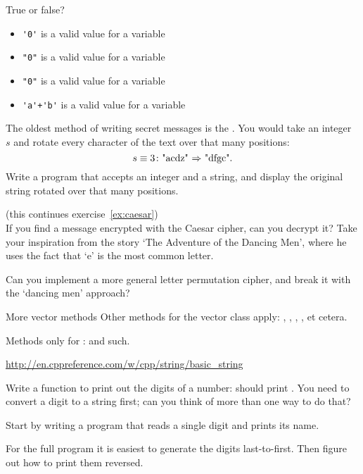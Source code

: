 \begin{review}
  \label{q:string}
  True or false?
  \begin{itemize}
  \item \verb+'0'+ is a valid value for a  variable
  \item \verb+"0"+ is a valid value for a  variable
  \item \verb+"0"+ is a valid value for a  variable
  \item \verb/'a'+'b'/ is a valid value for a  variable
  \end{itemize}
\end{review}

\begin{exercise}
  \label{ex:caesar}
  The oldest method of writing secret messages is the
  . You would take an integer~$s$ and rotate every character 
  of the text over that many positions:
  \[ s\equiv3\colon \hbox{"acdz" $\Rightarrow$ "dfgc"}. \]
  Write a program that accepts an integer and a string, and display
  the original string rotated over that many positions.
\end{exercise}
\begin{exercise}
  \label{ex:caesar-decrypt}
  (this continues exercise~\ref{ex:caesar})\\
  If you find a message encrypted with the Caesar cipher, can you
  decrypt it? Take your inspiration from the
   story `The Adventure of the Dancing
  Men', where he uses the fact that `e' is the most common letter.

  Can you implement a more general letter permutation cipher, and
  break it with the `dancing men' approach?
\end{exercise}

\begin{block}{More vector methods}
  \label{sl:string-vector-methods}
  Other methods for the vector class apply: , ,
  , , et cetera.

  Methods only for :  and such.

  \url{http://en.cppreference.com/w/cpp/string/basic_string}
\end{block}

\begin{exercise}
  \label{ex:printdigits}
  Write a function to print out the digits of a number:  should
  print .
  You need to convert a digit to a string first; can you think of more
  than one way to do that?

  Start by writing a program that reads a single digit and prints its name.

  For the full program it is easiest to generate the  digits last-to-first.
  Then figure out how to print them reversed.
\end{exercise}

